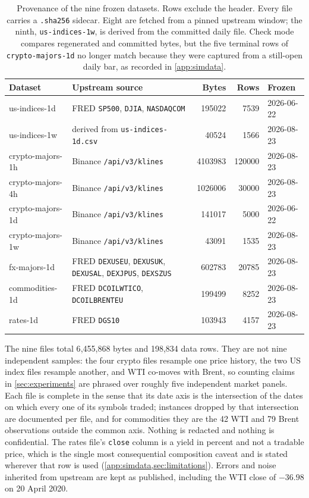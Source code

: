 \begin{table}[t]
\centering
\footnotesize
\setlength{\tabcolsep}{4pt}
\caption{Provenance of the nine frozen datasets. Rows exclude the header. Every file carries a \texttt{.sha256} sidecar. Eight are fetched from a pinned upstream window; the ninth, \texttt{us-indices-1w}, is derived from the committed daily file. Check mode compares regenerated and committed bytes, but the five terminal rows of \texttt{crypto-majors-1d} no longer match because they were captured from a still-open daily bar, as recorded in \cref{app:simdata}.}
\label{tab:datasheet}
\begin{tabular}{llrrl}
\toprule
Dataset & Upstream source & Bytes & Rows & Frozen \\
\midrule
us-indices-1d & FRED \texttt{SP500}, \texttt{DJIA}, \texttt{NASDAQCOM} & 195022 & 7539 & 2026-06-22 \\
us-indices-1w & derived from \texttt{us-indices-1d.csv} & 40524 & 1566 & 2026-08-23 \\
crypto-majors-1h & Binance \texttt{/api/v3/klines} & 4103983 & 120000 & 2026-08-23 \\
crypto-majors-4h & Binance \texttt{/api/v3/klines} & 1026006 & 30000 & 2026-08-23 \\
crypto-majors-1d & Binance \texttt{/api/v3/klines} & 141017 & 5000 & 2026-06-22 \\
crypto-majors-1w & Binance \texttt{/api/v3/klines} & 43091 & 1535 & 2026-08-23 \\
fx-majors-1d & FRED \texttt{DEXUSEU}, \texttt{DEXUSUK}, \texttt{DEXUSAL}, \texttt{DEXJPUS}, \texttt{DEXSZUS} & 602783 & 20785 & 2026-08-23 \\
commodities-1d & FRED \texttt{DCOILWTICO}, \texttt{DCOILBRENTEU} & 199499 & 8252 & 2026-08-23 \\
rates-1d & FRED \texttt{DGS10} & 103943 & 4157 & 2026-08-23 \\
\bottomrule
\end{tabular}
\end{table}

The nine files total 6{,}455{,}868 bytes and 198{,}834 data rows. They are not nine independent samples: the four crypto files resample one price history, the two US index files resample another, and WTI co-moves with Brent, so counting claims in \cref{sec:experiments} are phrased over roughly five independent market panels. Each file is complete in the sense that its date axis is the intersection of the dates on which every one of its symbols traded; instances dropped by that intersection are documented per file, and for commodities they are the 42 WTI and 79 Brent observations outside the common axis. Nothing is redacted and nothing is confidential. The rates file's \texttt{close} column is a yield in percent and not a tradable price, which is the single most consequential composition caveat and is stated wherever that row is used (\cref{app:simdata,sec:limitations}). Errors and noise inherited from upstream are kept as published, including the WTI close of $-36.98$ on 20 April 2020.

